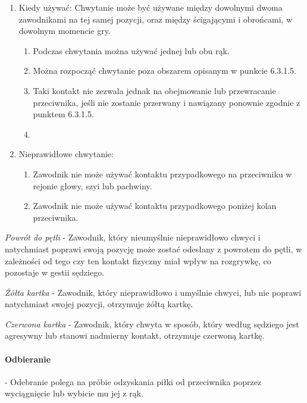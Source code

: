 \documentclass[12pt]{article}
\begin{document}
\begin{enumerate}
\item
    Kiedy używać: Chwytanie może być używane między dowolnymi dwoma
  zawodnikami na tej samej pozycji, oraz między ścigającymi i obrońcami,
  w dowolnym momencie gry.
  
  \begin{enumerate}
  \item
        Podczas chwytania można używać jednej lub obu rąk.
      \item
        Można rozpocząć chwytanie poza obszarem opisanym w punkcie
    6.3.1.5.\item Taki kontakt nie zezwala jednak na obejmowanie lub
    przewracanie przeciwnika, jeśli nie zostanie przerwany i nawiązany
    ponownie zgodnie z punktem 6.3.1.5.\item
      \end{enumerate}
\item
    Nieprawidłowe chwytanie:
  
  \begin{enumerate}
  \item
        Zawodnik nie może używać kontaktu przypadkowego na przeciwniku w
    rejonie głowy, szyi lub pachwiny.
      \item
        Zawodnik nie może używać kontaktu przypadkowego poniżej kolan
    przeciwnika.
      \end{enumerate}
\end{enumerate}

\emph{Powrót do pętli} - Zawodnik, który nieumyślnie nieprawidłowo
chwyci i natychmiast poprawi swoją pozycję może zostać odesłany z
powrotem do pętli, w zależności od tego czy ten kontakt fizyczny miał
wpływ na rozgrywkę, co pozostaje w gestii sędziego.

\emph{Żółta kartka} - Zawodnik, który nieprawidłowo i umyślnie chwyci,
lub nie poprawi natychmiast swojej pozycji, otrzymuje żółtą kartkę.

\emph{Czerwona kartka} - Zawodnik, który chwyta w sposób, który według
sędziego jest agresywny lub stanowi nadmierny kontakt, otrzymuje
czerwoną kartkę.

\paragraph{Odbieranie} - Odebranie polega na próbie odzyskania
piłki od przeciwnika poprzez wyciągnięcie lub wybicie mu jej z rąk.
\end{document}
